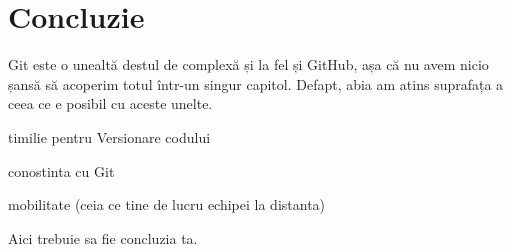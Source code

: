 \section*{Concluzie}

Git este o unealtă destul de complexă și la fel și GitHub, așa că nu avem nicio șansă să acoperim totul într-un singur capitol. Defapt, abia am atins suprafața a ceea ce e posibil cu aceste unelte.

timilie pentru Versionare codului

conostinta cu Git

mobilitate (ceia ce tine de lucru echipei la distanta)

Aici trebuie sa fie concluzia ta.

\clearpage